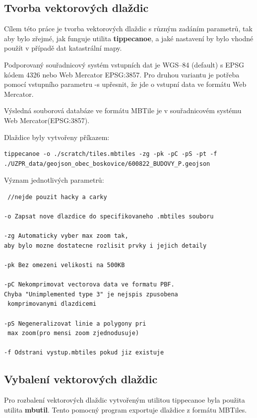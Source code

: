 \documentclass[12pt]{article}
\begin{document}
\subsection{Tvorba vektorových dlaždic}
Cílem této práce je tvorba vektorových dlaždic s různým zadáním parametrů, tak aby bylo zřejmé, jak funguje utilita \textbf{tippecanoe}, a jaké nastavení by bylo vhodné použít v případě dat katastrální mapy.

Podporovaný souřadnicový systém vstupních dat je WGS--84 (default) s EPSG kódem 4326 nebo Web Mercator EPSG:3857. Pro druhou variantu je potřeba pomocí vstupního parametru -s upřesnit, že jde o vstupní data ve formátu Web Mercator.

Výsledná souborová databáze ve formátu MBTile je v souřadnicovém systému Web Mercator(EPSG:3857).

\vspace{0.5cm}
Dlaždice byly vytvořeny příkazem:

\begin{lstlisting}
tippecanoe -o ./scratch/tiles.mbtiles -zg -pk -pC -pS -pt -f
./UZPR_data/geojson_obec_boskovice/600822_BUDOVY_P.geojson
\end{lstlisting}


\vspace{0.5cm}
Význam jednotlivých parametrů:
\begin{lstlisting} //nejde pouzit hacky a carky

-o Zapsat nove dlazdice do specifikovaneho .mbtiles souboru

-zg Automaticky vyber max zoom tak,
aby bylo mozne dostatecne rozlisit prvky i jejich detaily

-pk Bez omezeni velikosti na 500KB

-pC Nekomprimovat vectorova data ve formatu PBF.
Chyba "Unimplemented type 3" je nejspis zpusobena
 komprimovanymi dlazdicemi

-pS Negeneralizovat linie a polygony pri
 max zoom(pro mensi zoom zjednodusuje)

-f Odstrani vystup.mbtiles pokud jiz existuje
\end{lstlisting}


\subsection{Vybalení vektorových dlaždic}
Pro rozbalení vektorových dlaždic vytvořeným utilitou tippecanoe byla použita utilita \textbf{mbutil}. Tento pomocný program exportuje dlaždice z formátu \mbox{MBTiles}. 
\end{document}

